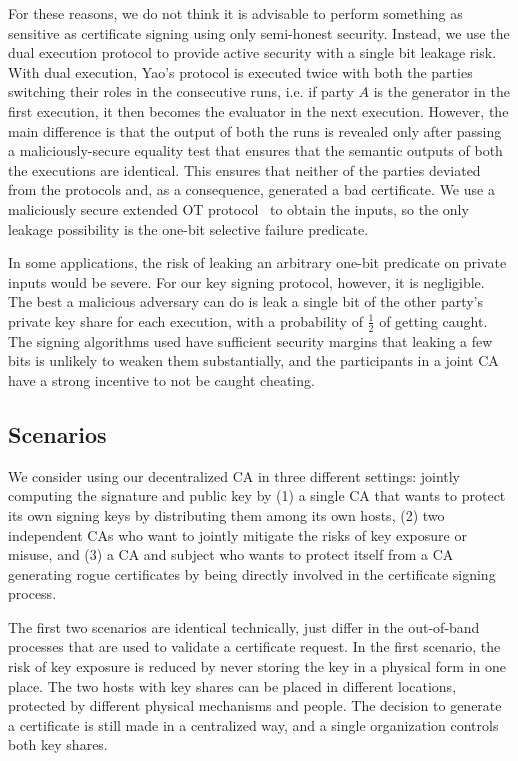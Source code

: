 For these reasons, we do not think it is advisable to perform something as sensitive as certificate signing using only semi-honest security. Instead, we use the dual execution protocol to provide active security with a single bit leakage risk. With dual execution, Yao's protocol is executed twice with both the parties switching their roles in the consecutive runs, i.e. if party $A$ is the generator in the first execution, it then becomes the evaluator in the next execution. However, the main difference is that the output of both the runs is revealed only after passing a maliciously-secure equality test that ensures that the semantic outputs of both the executions are identical. This ensures that neither of the parties deviated from the protocols and, as a consequence, generated a bad certificate.  We use a maliciously secure extended OT protocol~\cite{ishai2003extending} to obtain the inputs, so the only leakage possibility is the one-bit selective failure predicate.

In some applications, the risk of leaking an arbitrary one-bit predicate on private inputs would be severe. For our key signing protocol, however, it is negligible.  The best a malicious adversary can do is leak a single bit of the other party's private key share for each execution, with a probability of $\frac{1}{2}$ of getting caught. The signing algorithms used have sufficient security margins that leaking a few bits is unlikely to weaken them substantially, and the participants in a joint CA have a strong incentive to not be caught cheating.

\subsection{Scenarios}\label{sec:scenarios}
\label{sec:dca_setup}
We consider using our decentralized CA in three different settings: jointly computing the signature and public key by (1) a single CA that wants to protect its own signing keys by distributing them among its own hosts, (2) two independent CAs who want to jointly mitigate the risks of key exposure or misuse, and (3) a CA and subject who wants to protect itself from a CA generating rogue certificates by being directly involved in the certificate signing process.

The first two scenarios are identical technically, just differ in the out-of-band processes that are used to validate a certificate request.  In the first scenario, the risk of key exposure is reduced by never storing the key in a physical form in one place. The two hosts with key shares can be placed in different locations, protected by different physical mechanisms and people. The decision to generate a certificate is still made in a centralized way, and a single organization controls both key shares.  

